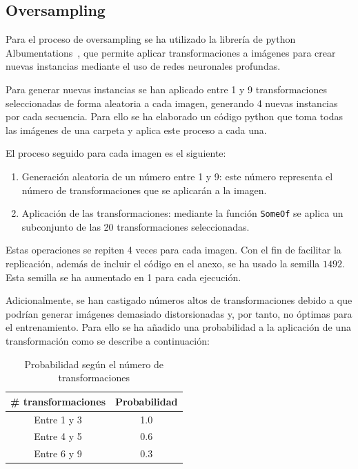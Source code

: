 \documentclass[12pt]{report} %
\begin{document}
    \subsection{Oversampling}

    Para el proceso de oversampling se ha utilizado la librería de python
    Albumentations~\cite{albumentations}, que permite aplicar transformaciones a imágenes
    para crear nuevas instancias mediante el uso de redes neuronales profundas.
    
    Para generar nuevas instancias se han aplicado entre 1 y 9 transformaciones
    seleccionadas de forma aleatoria a cada imagen, generando 4
    nuevas instancias por cada secuencia. Para ello se ha elaborado un código
    python que toma todas las imágenes de una carpeta y aplica este proceso a
    cada una.

    El proceso seguido para cada imagen es el siguiente: 
    \begin{enumerate}
        \item Generación aleatoria de un número entre 1 y 9: este número representa el número de transformaciones que se aplicarán a la imagen.
        \item Aplicación de las transformaciones: mediante la función \texttt{SomeOf} se aplica un subconjunto de las 20 transformaciones seleccionadas.
    \end{enumerate}
    Estas operaciones se repiten 4 veces para cada imagen. Con el fin de
    facilitar la replicación, además de incluir el código en el anexo, se ha
    usado la semilla $1492$. Esta semilla se ha aumentado en 1 para cada
    ejecución.

    Adicionalmente, se han castigado números altos de transformaciones debido a
    que podrían generar imágenes demasiado distorsionadas y, por tanto, no
    óptimas para el entrenamiento. Para ello se ha añadido una probabilidad a
    la aplicación de una transformación como se describe a continuación:

    \begin{table}[H]
    \centering
        \begin{tabular}{cc}
        \toprule
        \textbf{\# transformaciones} & \textbf{Probabilidad} \\
        \midrule
        Entre 1 y 3 & 1.0\\
        Entre 4 y 5 & 0.6\\
        Entre 6 y 9 & 0.3\\
        \bottomrule
        \end{tabular}
    \caption{Probabilidad según el número de transformaciones}
    \end{table}
\end{document}
